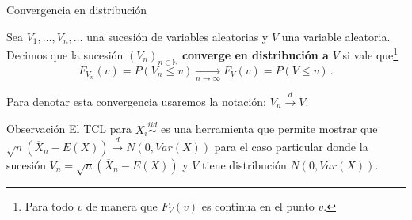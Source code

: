 \documentclass{beamer}
\theoremstyle{definition}
\newcommand{\NN}{\mathbb{N}}
\newcommand{\ton}{\underset{n\to\infty}{\longrightarrow}}
\newcommand{\cw}{\overset{d}{\rightarrow}}
\begin{document}

\begin{frame}{\color{rosee}Convergencia en distribuci\'on}\small
  
    Sea \small{$V_{1},\dots,V_n,\dots$} una sucesi\'on de variables aleatorias
    y  $V$ una variable aleatoria. Decimos que la sucesión $(V_n)_{n\in\NN}$ \textbf{converge en
    distribuci\'on a} $V$ si vale
    que\footnote{Para todo $v$ de manera que $F_{V}(v)$ es continua en el punto $v$.}
    \[F_{V_n}(v)=P(V_n\leq v) \ton F_V (v)=P(V \leq v)\,.\]
    
    Para denotar esta convergencia usaremos la notación: $V_n \stackrel{d}{\to} V$.
  
    \begin{alertblock}{\color{rosee}Observaci\'on}
    El TCL  para $X_i\stackrel{iid}{\sim}$ es una herramienta que permite mostrar que $\sqrt{n}(\overline{X}_n-E(X))\cw N(0,Var(X))$ para el caso particular donde la sucesión $V_n=\sqrt{n}(\overline{X}_n-E(X))$ y $V$ tiene distribución $N(0,Var(X))$. 
  \end{alertblock}
  
\end{frame}
\end{document}
